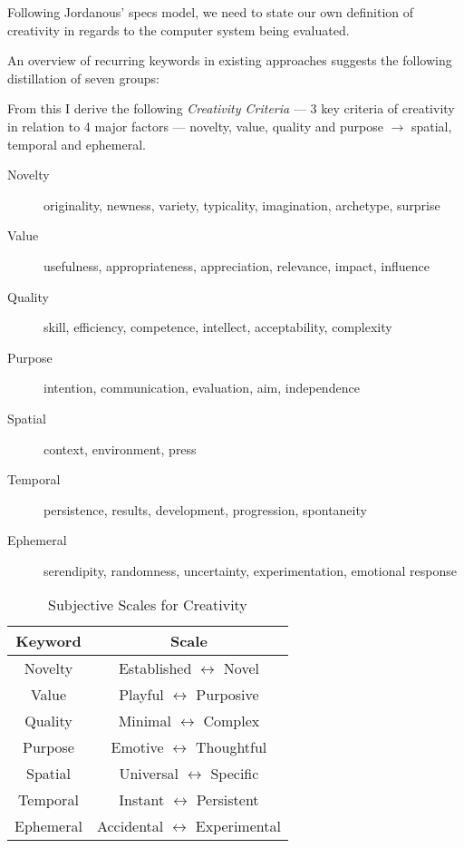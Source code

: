 Following Jordanous' \gls{specs} model, we need to state our own definition of creativity in regards to the computer system being evaluated.

An overview of recurring keywords in existing approaches suggests the following distillation of seven groups:

From this I derive the following \hypertarget{creadef}{\emph{Creativity Criteria}} --- 3 key criteria of creativity in relation to 4 major factors --- novelty, value, quality and purpose $\to$ spatial, temporal and ephemeral.

\begin{description}
  \item [Novelty] originality, newness, variety, typicality, imagination, archetype, surprise
  \item [Value] usefulness, appropriateness, appreciation, relevance, impact, influence
  \item [Quality] skill, efficiency, competence, intellect, acceptability, complexity
  \item [Purpose] intention, communication, evaluation, aim, independence
  \item [Spatial] context, environment, press
  \item [Temporal] persistence, results, development, progression, spontaneity
  \item [Ephemeral] serendipity, randomness, uncertainty, experimentation, emotional response
\end{description}


\begin{table}
\centering
  \begin{tabu}{cc}
  \toprule
  \textbf{Keyword} & \textbf{Scale} \\
  \midrule
  Novelty & Established $\leftrightarrow$ Novel \\
  Value & Playful $\leftrightarrow$ Purposive \\
  Quality & Minimal $\leftrightarrow$ Complex \\
  Purpose & Emotive $\leftrightarrow$ Thoughtful \\
  Spatial & Universal $\leftrightarrow$ Specific \\
  Temporal & Instant $\leftrightarrow$ Persistent \\
  Ephemeral & Accidental $\leftrightarrow$ Experimental \\
  \bottomrule
  \end{tabu}
\caption[Subjective Scales for Creativity]{Subjective Scales for Creativity}
\label{table_subcreat}
\end{table}


